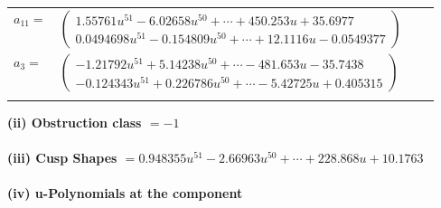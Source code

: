 \documentclass[1p]{elsarticle_modified}
\theoremstyle{definition}
\begin{document}
\begin{tabular}{m{7pt} m{180pt} m{7pt} m{180pt} }
\flushright $a_{11}=$&$\begin{pmatrix}1.55761 u^{51}-6.02658 u^{50}+\cdots+450.253 u+35.6977\\0.0494698 u^{51}-0.154809 u^{50}+\cdots+12.1116 u-0.0549377\end{pmatrix}$ \\
\flushright $a_{3}=$&$\begin{pmatrix}-1.21792 u^{51}+5.14238 u^{50}+\cdots-481.653 u-35.7438\\-0.124343 u^{51}+0.226786 u^{50}+\cdots-5.42725 u+0.405315\end{pmatrix}$\\&\end{tabular}
\flushleft \textbf{(ii) Obstruction class $= -1$}\\~\\
\flushleft \textbf{(iii) Cusp Shapes $= 0.948355 u^{51}-2.66963 u^{50}+\cdots+228.868 u+10.1763$}\\~\\
\newpage\renewcommand{\arraystretch}{1}
\flushleft \textbf{(iv) u-Polynomials at the component}\newline \\
\end{document}

